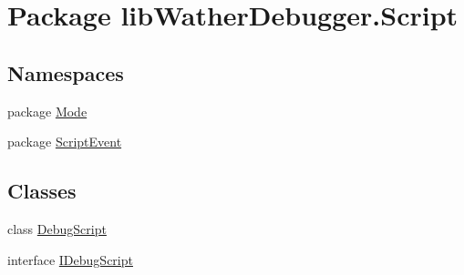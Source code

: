 \hypertarget{namespacelib_wather_debugger_1_1_script}{\section{Package lib\+Wather\+Debugger.\+Script}
\label{namespacelib_wather_debugger_1_1_script}
}
\subsection*{Namespaces}
\begin{DoxyCompactItemize}
\item 
package \hyperlink{namespacelib_wather_debugger_1_1_script_1_1_mode}{Mode}
\item 
package \hyperlink{namespacelib_wather_debugger_1_1_script_1_1_script_event}{Script\+Event}
\end{DoxyCompactItemize}
\subsection*{Classes}
\begin{DoxyCompactItemize}
\item 
class \hyperlink{classlib_wather_debugger_1_1_script_1_1_debug_script}{Debug\+Script}
\item 
interface \hyperlink{interfacelib_wather_debugger_1_1_script_1_1_i_debug_script}{I\+Debug\+Script}
\end{DoxyCompactItemize}
